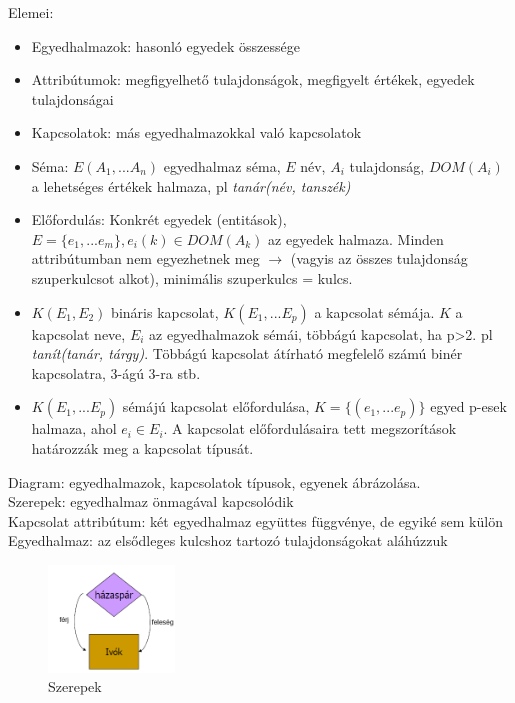 \documentclass[margin=0px]{article}
\begin{document}
Elemei:
\begin{itemize}
    \item Egyedhalmazok: hasonló egyedek összessége
    \item Attribútumok: megfigyelhető tulajdonságok, megfigyelt értékek, egyedek tulajdonságai
    \item Kapcsolatok: más egyedhalmazokkal való kapcsolatok
    \item Séma: $E(A_1,...A_n)$ egyedhalmaz séma, $E$ név, $A_i$ tulajdonság, $DOM(A_i)$ a lehetséges értékek halmaza, pl \textit{tanár(név, tanszék)}
    \item Előfordulás: Konkrét egyedek (entitások), $E=\{e_1,...e_m\}, e_i(k) \in DOM(A_k)$ az egyedek halmaza. Minden attribútumban nem egyezhetnek meg $\to$ (vagyis az összes tulajdonság szuperkulcsot alkot), minimális szuperkulcs = kulcs.
    \item $K(E_1,E_2)$ bináris kapcsolat, $K(E_1,...E_p)$ a kapcsolat sémája. $K$ a kapcsolat neve, $E_i$ az egyedhalmazok sémái, többágú kapcsolat, ha p>2. pl \textit{tanít(tanár, tárgy)}. Többágú kapcsolat átírható megfelelő számú binér kapcsolatra, 3-ágú 3-ra stb.
    \item $K(E_1,...E_p)$ sémájú kapcsolat előfordulása, $K=\{(e_1,...e_p)\}$ egyed p-esek halmaza, ahol $e_i \in E_i$. A kapcsolat előfordulásaira tett megszorítások határozzák meg a kapcsolat típusát.
\end{itemize}
Diagram: egyedhalmazok, kapcsolatok típusok, egyenek ábrázolása. \\
Szerepek: egyedhalmaz önmagával kapcsolódik \\
Kapcsolat attribútum: két egyedhalmaz együttes függvénye, de egyiké sem külön \\
Egyedhalmaz: az elsődleges kulcshoz tartozó tulajdonságokat aláhúzzuk \\

\begin{figure}[H]
    \centering
    \includegraphics[width=0.3\textwidth]{img/ek4.png}
    \caption{Szerepek}
\end{figure}
\end{document}
